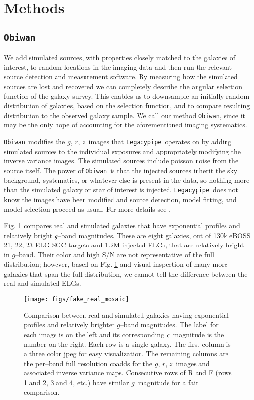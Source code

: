 \documentclass[a4paper,fleqn,usenatbib]{mnras}
\newcommand{\gb}{$g$}
\newcommand{\rband}{$r$}
\newcommand{\zb}{$z$}
\newcommand{\legacypipe}{{\tt Legacypipe}}
\newcommand{\obiwan}{{\tt Obiwan}}
\begin{document}
\section{Methods}
\label{sec:methods}

\subsection{\obiwan}
\label{sec:methods-obiwan}

We add simulated sources, with properties closely matched to the galaxies of interest, to random locations in the imaging data and then run the relevant source detection and measurement software. By measuring how the simulated sources are lost and recovered we can completely describe the angular selection function of the galaxy survey. This enables us to downsample an initially random distribution of galaxies, based on the selection function, and to compare resulting distribution to the observed galaxy sample. We call our method \obiwan, since it may be the only hope of accounting for the aforementioned imaging systematics. 

\obiwan\, modifies the \gb, \rband, \zb\, images that \legacypipe\, operates on by adding simulated sources to the individual exposures and appropriately modifying the inverse variance images. The simulated sources include poisson noise from the source itself. The power of \obiwan\, is that the injected sources inherit the sky background, systematics, or whatever else is present in the data, so nothing more than the simulated galaxy or star of interest is injected. \legacypipe\, does not know the images have been modified and source detection, model fitting, and model selection proceed as usual. For more details see \cite{obiwanMethods}.

Fig. \ref{fig:examples-bright} compares real and simulated galaxies that have exponential profiles and relatively bright \gb--band magnitudes. These are eight galaxies, out of 130k eBOSS 21, 22, 23 ELG SGC targets and 1.2M injected ELGs, that are relatively bright in \gb--band. Their color and high S/N are not representative of the full distribution; however, based on Fig. \ref{fig:examples-bright} and visual inspection of many more galaxies that span the full distribution, we cannot tell the difference between the real and simulated ELGs. 

\begin{figure}
 \texttt{[image: figs/fake\_real\_mosaic]}
 \caption{Comparison between real and simulated galaxies having exponential profiles and relatively brighter \gb--band magnitudes. The label for each image is on the left and its corresponding \gb\, magnitude is the number on the right. Each row is a single galaxy. The first column is a three color jpeg for easy visualization. The remaining columns are the per--band full resolution coadds for the \gb, \rband, \zb\ images and associated inverse variance maps. Consecutive rows of R and F (rows 1 and 2, 3 and 4, etc.) have similar \gb\, magnitude for a fair comparison.}
 \label{fig:examples-bright}
\end{figure} 
\end{document}
